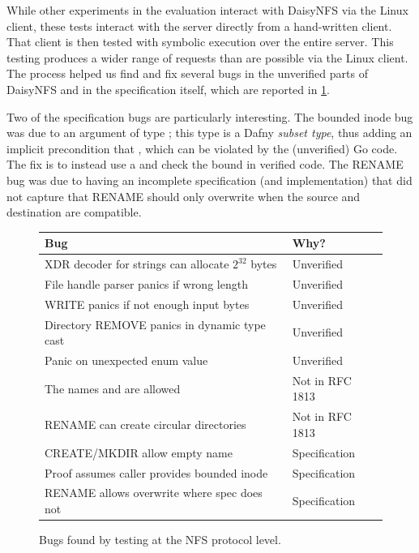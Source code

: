 While other experiments in the evaluation interact with DaisyNFS via the Linux
client, these tests interact with the server directly from a hand-written
client. That client is then tested with symbolic execution over the entire server.
This testing produces a wider range of requests than are possible via the Linux
client. The process helped us find and fix several bugs in the unverified parts
of DaisyNFS and in the specification itself, which are reported in
\cref{fig:daisynfs-bugs}.

Two of the specification bugs are particularly interesting. The bounded inode bug
was due to an  argument of type ; this type is a Dafny
\emph{subset type}, thus adding an implicit precondition that , which can be violated by the (unverified) Go code. The fix is to instead
use a  and check the bound in verified code. The RENAME bug was due
to having an incomplete specification (and implementation) that did not capture
that RENAME should only overwrite when the source and destination are
compatible.

\begin{figure}
  \begin{center}
  \begin{tabular}{@{}p{8cm}p{2.7cm}@{}}
    \toprule
    \textbf{Bug} & \textbf{Why?} \\
    \midrule
    XDR decoder for strings can allocate $2^{32}$ bytes & Unverified \\
    File handle parser panics if wrong length & Unverified \\
    WRITE panics if not enough input bytes & Unverified \\
    Directory REMOVE panics in dynamic type cast & Unverified \\
    Panic on unexpected enum value & Unverified \\
    The names \cc{.} and \cc{..} are allowed & Not in RFC 1813 \\
    RENAME can create circular directories & Not in RFC 1813 \\
    CREATE/MKDIR allow empty name & Specification \\
    Proof assumes caller provides bounded inode & Specification \\
    RENAME allows overwrite where spec does not & Specification \\
    \bottomrule
  \end{tabular}
  \end{center}
  \caption{Bugs found by testing at the NFS protocol level.}
  \label{fig:daisynfs-bugs}
\end{figure}

